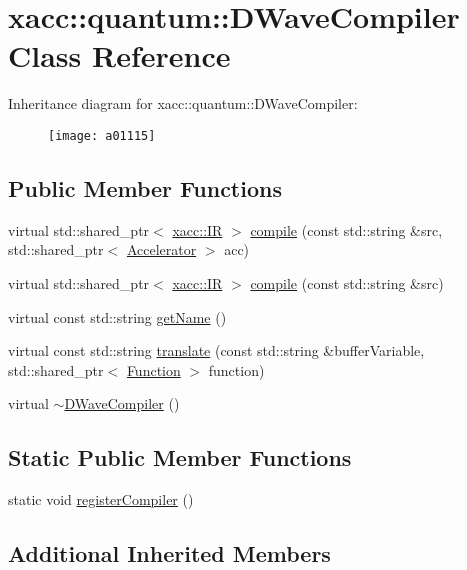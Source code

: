 \hypertarget{a01115}{}\section{xacc\+:\+:quantum\+:\+:D\+Wave\+Compiler Class Reference}
\label{a01115}
Inheritance diagram for xacc\+:\+:quantum\+:\+:D\+Wave\+Compiler\+:\begin{figure}[H]
\begin{center}
\leavevmode
\texttt{[image: a01115]}
\end{center}
\end{figure}
\subsection*{Public Member Functions}
\begin{DoxyCompactItemize}
\item 
virtual std\+::shared\+\_\+ptr$<$ \hyperlink{a01499}{xacc\+::\+IR} $>$ \hyperlink{a01115_a0f7f6b10b4a881cb27b36eaa6d39e7b1}{compile} (const std\+::string \&src, std\+::shared\+\_\+ptr$<$ \hyperlink{a01435}{Accelerator} $>$ acc)
\item 
virtual std\+::shared\+\_\+ptr$<$ \hyperlink{a01499}{xacc\+::\+IR} $>$ \hyperlink{a01115_a893e1d1c81a8aaf6e2435c9bceab575e}{compile} (const std\+::string \&src)
\item 
virtual const std\+::string \hyperlink{a01115_a8a180031ae563e1a9aac611e8066c181}{get\+Name} ()
\item 
virtual const std\+::string \hyperlink{a01115_a73a8839c55d22c68e5264feca8d626d4}{translate} (const std\+::string \&buffer\+Variable, std\+::shared\+\_\+ptr$<$ \hyperlink{a01475}{Function} $>$ function)
\item 
virtual \hyperlink{a01115_acc0ab28f787b8f4cbeb63c594a247e50}{$\sim$\+D\+Wave\+Compiler} ()
\end{DoxyCompactItemize}
\subsection*{Static Public Member Functions}
\begin{DoxyCompactItemize}
\item 
static void \hyperlink{a01115_a5b221649f22a9bb4d4a304a6522d071f}{register\+Compiler} ()
\end{DoxyCompactItemize}
\subsection*{Additional Inherited Members}


